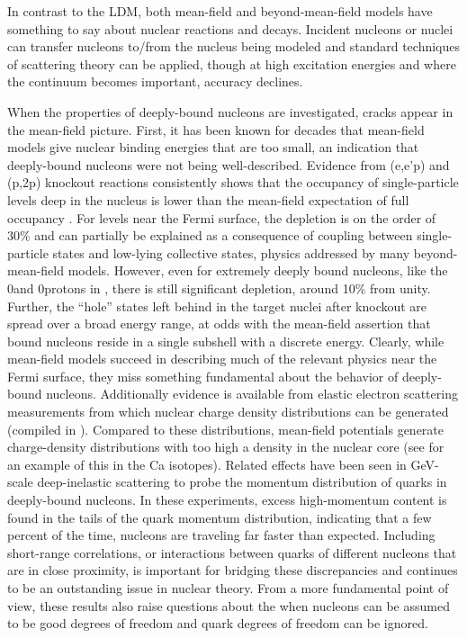 
In contrast to the LDM, both mean-field and beyond-mean-field models have
something to say about nuclear reactions and decays. Incident nucleons or nuclei can
transfer nucleons to/from the nucleus being modeled and standard
techniques of scattering theory can be applied, though at high excitation
energies and where the continuum becomes important, accuracy declines.

When the properties of deeply-bound nucleons are investigated, cracks appear in the mean-field
picture. First, it has been known for decades that mean-field models give nuclear binding energies
that are too small, an indication that deeply-bound nucleons were not being well-described. Evidence
from (e,e'p) and (p,2p) knockout reactions 
consistently shows that the occupancy of single-particle levels deep in the nucleus is lower
than the mean-field expectation of full occupancy \cite{Mougey1980, Jacob1966, Jacob1973}.
For levels near the Fermi surface, the depletion is on the order of 30\% and can partially be
explained as a consequence of coupling between single-particle states and low-lying collective
states, physics addressed by many beyond-mean-field models. However, even for extremely deeply bound
nucleons, like the 0\sOne and 0\pThree protons in \pbEight, there is still significant depletion,
around 10\% from unity. Further, the ``hole'' states left behind in the target nuclei after knockout are
spread over a broad energy range, at odds with the mean-field assertion that bound nucleons
reside in a single subshell with a discrete energy. Clearly, while mean-field models succeed in
describing much of the relevant physics near the Fermi surface, they miss something fundamental
about the behavior of deeply-bound nucleons. 
Additionally evidence is available from elastic electron scattering measurements from which nuclear
charge density distributions can be generated (compiled in \cite{DeVries1987}). Compared to these
distributions, mean-field potentials generate charge-density distributions with too high a density
in the nuclear core (see \cite{Brown1979} for an example of this in the Ca isotopes).
Related effects have been seen in GeV-scale deep-inelastic scattering to probe the momentum
distribution of quarks in deeply-bound nucleons. In these experiments, excess high-momentum
content is found in the tails of the quark momentum distribution, indicating that a few percent of the time, 
nucleons are traveling far faster than expected. Including short-range
correlations, or interactions between quarks of different nucleons that are in close proximity,
is important for bridging these discrepancies and continues to be an outstanding issue in nuclear 
theory. From a more fundamental point of view, these results also raise questions about the when nucleons
can be assumed to be good degrees of freedom and quark degrees of freedom can be ignored.

